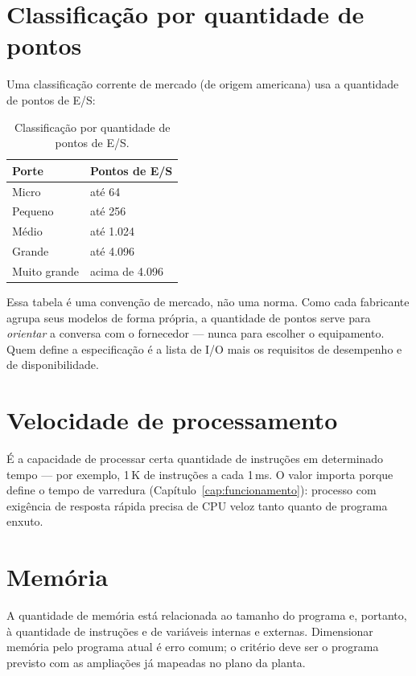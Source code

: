 \section{Classificação por quantidade de pontos}

Uma classificação corrente de mercado (de origem americana) usa a quantidade de pontos de E/S:

\begin{table}[H]
  \centering
  \caption{Classificação por quantidade de pontos de E/S.}
  \label{tab:classificacao-porte}
  \begin{tabular}{l l}
    \toprule
    Porte & Pontos de E/S \\
    \midrule
    Micro & até 64 \\
    Pequeno & até 256 \\
    Médio & até 1.024 \\
    Grande & até 4.096 \\
    Muito grande & acima de 4.096 \\
    \bottomrule
  \end{tabular}
\end{table}

\begin{atencao}
Essa tabela é uma convenção de mercado, não uma norma. Como cada fabricante agrupa seus modelos de
forma própria, a quantidade de pontos serve para \emph{orientar} a conversa com o fornecedor --- nunca
para escolher o equipamento. Quem define a especificação é a lista de I/O mais os requisitos de
desempenho e de disponibilidade.
\end{atencao}

\section{Velocidade de processamento}

É a capacidade de processar certa quantidade de instruções em determinado tempo --- por exemplo,
1\,K de instruções a cada 1\,ms. O valor importa porque define o tempo de varredura
(Capítulo~\ref{cap:funcionamento}): processo com exigência de resposta rápida precisa de CPU veloz
tanto quanto de programa enxuto.

\section{Memória}

A quantidade de memória está relacionada ao tamanho do programa e, portanto, à quantidade de
instruções e de variáveis internas e externas. Dimensionar memória pelo programa atual é erro
comum; o critério deve ser o programa previsto com as ampliações já mapeadas no plano da planta.

